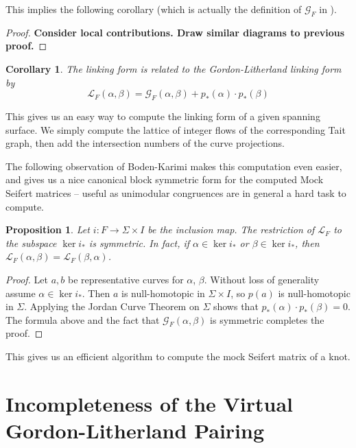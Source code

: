 \documentclass[12pt]{report}
\newcommand{\notered}[1]{{\color{Red} \textbf{#1}}}
\newtheorem*{proposition}{Proposition}
\newtheorem*{corollary}{Corollary}
\begin{document}
This implies the following corollary (which is actually the definition of $\mathcal{G}_{F}$ in \cite{gordon-litherland-pairing-thickened-surfaces}).

\begin{proof}
	\notered{Consider local contributions. Draw similar diagrams to previous proof.}
\end{proof}

\begin{corollary}
The linking form is related to the Gordon-Litherland linking form by
\[\mathcal{L}_{F}(\alpha, \beta) = \mathcal{G}_{F}(\alpha, \beta) + p_{*}(\alpha) \cdot p_{*}(\beta)\]
\end{corollary}

This gives us an easy way to compute the linking form of a given spanning surface. We simply compute the lattice of integer flows of the corresponding Tait graph, then add the intersection numbers of the curve projections.

The following observation of Boden-Karimi \cite[Remark 3.2]{mock-seifert-matrices} makes this computation even easier, and gives us a nice canonical block symmetric form for the computed Mock Seifert matrices -- useful as unimodular congruences are in general a hard task to compute.

\begin{proposition}
	Let $i: F \longrightarrow \Sigma \times I$ be the inclusion map. The restriction of $\mathcal{L}_{F}$ to the subspace $\ker i_{*}$ is symmetric. In fact, if $\alpha \in \ker i_{*}$ or $\beta \in \ker i_{*}$, then $\mathcal{L}_{F}(\alpha, \beta) = \mathcal{L}_{F}(\beta, \alpha)$.
\end{proposition}

\begin{proof}
	Let $a, b$ be representative curves for $\alpha$, $\beta$. Without loss of generality assume $\alpha \in \ker i_{*}$. Then $a$ is null-homotopic in $\Sigma \times I$, so $p(a)$ is null-homotopic in $\Sigma$. Applying the Jordan Curve Theorem on $\Sigma$  shows that $p_{*}(\alpha) \cdot p_{*}(\beta) = 0$. The formula above and the fact that $\mathcal{G}_{F}(\alpha, \beta)$ is symmetric completes the proof.
\end{proof}

This gives us an efficient algorithm to compute the mock Seifert matrix of a knot.

\section{Incompleteness of the Virtual Gordon-Litherland Pairing}
\end{document}
